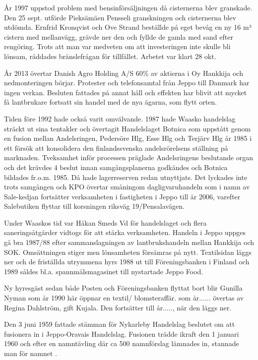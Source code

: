 År 1997 uppstod problem med bensinförsäljningen då cisternerna blev granskade. Den 25 sept. utförde Pieksämäen Pensseli granskningen och cisternerna blev utdömda. Ernfrid Kronqvist och Ove Strand beställde på eget bevåg en ny 16 m³ cistern med mellanvägg, grävde ner den och fyllde de gamla med sand efter rengöring. Trots att man var medveten om att investeringen inte skulle bli lönsam, räddades bränslefrågan för tillfället. Arbetet var klart 28 okt.

År 2013 övertar Danish Agro Holding A/S 60\% av aktierna i Oy Hankkija  och nedmonteringen börjar. Protester och telefonsamtal från Jeppo till Danmark har ingen verkan. Besluten fattades på annat håll och effekten har blivit att mycket få lantbrukare fortsatt sin handel med de nya ägarna, som flytt orten.


Tiden före 1992 hade också varit omvälvande. 1987 hade Waasko handelslag sträckt ut sina tentakler och övertagit Handelslaget Botnica som uppstått genom en fusion mellan Andelsringen, Pedersöre Hlg, Esse Hlg och Terjärv Hlg år 1985 i ett försök att konsolidera den finlandssvenska andelsrörelsens ställning på marknaden. Tveksamhet inför processen präglade Andelsringens beslutande organ och det krävdes 4 beslut innan samgångsplanerna godkändes och Botnica bildades fr.o.m. 1985. Då hade lagerreserven redan utnyttjats. Det lyckades inte trots samgången och KPO övertar småningom dagligvaruhandeln som i namn av Sale-kedjan fortsätter verksamheten i fastigheten i Jeppo till år 2006, varefter Salebutiken flyttar till korsningen riksväg 19/Pensalavägen.


Under Waaskos tid var Håkan Smeds Vd för handelslaget och flera saneringsåtgärder vidtogs för att stärka verksamheten. Handeln i Jeppo uppges gå bra 1987/88 efter sammanslagningen av lantbrukshandeln mellan Hankkija och SOK. Omsättningen stiger men lönsamheten försämras på nytt. Textilsidan läggs ner och de friställda utrymmena hyrs 1988 ut till Föreningsbanken i Finland och 1989 såldes bl.a. spannmålsmagasinet till nystartade Jeppo Food.

Ny hyresgäst sedan både Posten och Föreningsbanken flyttat bort blir Gunilla Nyman som år 1990 här öppnar en textil/ blomsteraffär. som år...... övertas av Regina Dahlström, gift Kujala. Den fortsätter till år....., när den läggs ner.


Den 3 juni 1959 fattade stämman för Nykarleby Handelslag  beslutet om att fusionera in i Jeppo-Oravais Handelslag. Fusionen trädde ikraft den 1 januari 1960 och efter en namntävling där ca 500 namnförslag lämnades in, stannade man för namnet .

